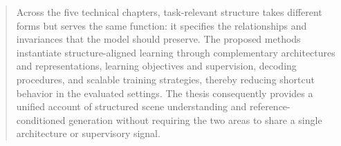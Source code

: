 \begin{abstract}
Across the five technical chapters, task-relevant structure takes different forms but serves the same function: it specifies the relationships and invariances that the model should preserve. The proposed methods instantiate structure-aligned learning through complementary architectures and representations, learning objectives and supervision, decoding procedures, and scalable training strategies, thereby reducing shortcut behavior in the evaluated settings. The thesis consequently provides a unified account of structured scene understanding and reference-conditioned generation without requiring the two areas to share a single architecture or supervisory signal.
\end{abstract}
